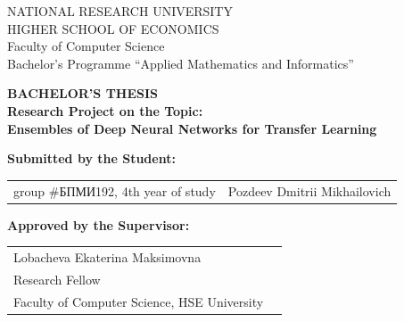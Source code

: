 \begin{titlepage}
\newpage

{
\begin{center}
NATIONAL RESEARCH UNIVERSITY\\
HIGHER SCHOOL OF ECONOMICS
\\
\bigskip
Faculty of Computer Science\\
Bachelor’s Programme “Applied Mathematics and Informatics”
\end{center}
}

\vspace{7em}

\begin{center}
{\bf BACHELOR'S THESIS}\\
{\bf Research Project on the Topic:}\\
{\bf Ensembles of Deep Neural Networks for Transfer Learning}\\
\end{center}

\vspace{2em}

{\bf Submitted by the Student: \vspace{2mm}}

{
\begin{tabular}{l@{\hskip 1.5cm}l}
group \#\foreignlanguage{russian}{БПМИ}192, 4th year of study & 
Pozdeev Dmitrii Mikhailovich 
\end{tabular}}


\vspace{1em}
{\bf Approved by the Supervisor: \vspace{2mm}}

{
\begin{tabular}{l@{\hskip 1.5cm}l}
Lobacheva Ekaterina Maksimovna\\
Research Fellow\\
Faculty of Computer Science, HSE University 
\end{tabular}}


\end{titlepage}

